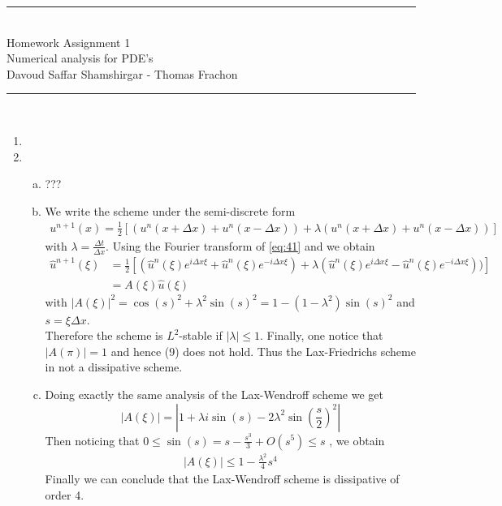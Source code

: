 \documentclass[10pt,a4paper,twoside, french]{article}
\numberwithin{equation}{section}
\numberwithin{figure}{section}
\numberwithin{table}{section}
\newcommand{\chap}[1]{\widehat{#1}}
\begin{document}
	\vspace{1cm}    
    \begin{center}
       		\rule{10cm}{1pt} \\[0.6cm]         %
        	{\huge Homework Assignment 1 \\[0.2cm]
         \Large  Numerical analysis for PDE's\\[0.2cm] 
          \large Davoud Saffar Shamshirgar - Thomas Frachon}  \\[0.6cm]
    		\rule{10cm}{1pt} \\[0.5cm]  
	\end{center}    
	
\setcounter{section}{1}
\begin{enumerate}
\item \begin{enumerate}[a.]

\end{enumerate}


\setcounter{section}{4}
\item  \begin{enumerate}[a.]
\item ???
\item We write the scheme under the semi-discrete form
\begin{align}
u^{n+1}(x) = \frac{1}{2} \left[(u^n(x+\Delta x) +u^n(x-\Delta x)) + \lambda(u^n(x+\Delta x) +u^n(x-\Delta x))\right] 
\label{eq:41}
\end{align}
with $\lambda=\frac{\Delta t }{\Delta x}$. Using the Fourier transform of \ref{eq:41} and we obtain
\begin{align*}
\chap{u}^{n+1}(\xi)  & = \frac{1}{2} \left[(\chap{u}^n(\xi)e^{i\Delta x \xi} +\chap{u}^n(\xi)e^{-i\Delta x \xi}) 
+ \lambda(\chap{u}^n(\xi)e^{i\Delta x \xi} -\chap{u}^n(\xi)e^{-i\Delta x \xi}) )\right] \\
 & = A(\xi)\chap{u}(\xi)
\end{align*}
with $|A(\xi)|^2 = \cos(s)^2 +\lambda^2 \sin(s)^2 = 1-(1-\lambda^2)\sin(s)^2$ and $s=\xi \Delta x$.\\
Therefore the scheme is $L^2$-stable if $|\lambda | \leq 1$. Finally, one notice that $|A(\pi)| =1$ and hence (9) does not hold. Thus the Lax-Friedrichs scheme in not a dissipative scheme. \\


\item Doing exactly the same analysis of the Lax-Wendroff scheme we get 
$$ |A(\xi)| = |1+\lambda i \sin(s) - 2\lambda^2 \sin(\frac{s}{2})^2 | $$
Then noticing that $0 \leq \sin(s) = s - \frac{s^3}{3} +O(s^5) \leq s$ , we obtain
\begin{align*}
|A(\xi)|  \leq 1-\frac{\lambda^2}{4} s^4 
\end{align*}
Finally we can conclude that the Lax-Wendroff scheme is dissipative of order 4.



\end{enumerate}	
\end{enumerate}
	
	
	
	
\end{document}
